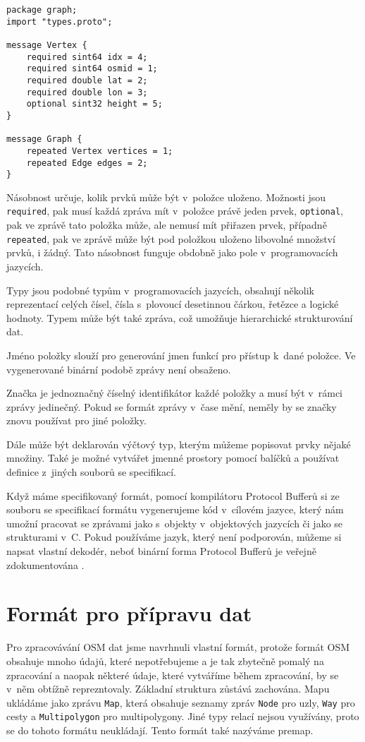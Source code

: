 \begin{verbatim}
package graph;
import "types.proto";

message Vertex {
    required sint64 idx = 4;
    required sint64 osmid = 1;
    required double lat = 2;
    required double lon = 3;
    optional sint32 height = 5;
}

message Graph {
    repeated Vertex vertices = 1;
    repeated Edge edges = 2;
}
\end{verbatim}

{\tuc Násobnost} určuje, kolik prvků může být v~položce uloženo. Možnosti jsou
\verb|required|, pak musí každá zpráva mít v~položce právě jeden prvek,
\verb|optional|, pak ve zprávě tato položka může, ale nemusí mít přiřazen prvek,
případně \verb|repeated|, pak ve zprávě může být pod položkou uloženo libovolné
množství prvků, i žádný. Tato násobnost funguje obdobně jako pole
v~programovacích jazycích. 

\smallskip
{\tuc Typy} jsou podobné typům v~programovacích jazycích, obsahují několik
reprezentací celých čísel, čísla s~plovoucí desetinnou čárkou, řetězce a logické
hodnoty. Typem může být také zpráva, což umožňuje hierarchické strukturování
dat. 

\smallskip
{\tuc Jméno} položky slouží pro generování jmen funkcí pro přístup k~dané
položce. Ve vygenerované binární podobě zprávy není obsaženo. 

\smallskip
{\tuc Značka} je jednoznačný číselný identifikátor každé položky a musí být v~rámci
zprávy jedinečný. Pokud se formát zprávy v~čase mění, neměly by se značky znovu
používat pro jiné položky.

Dále může být deklarován výčtový typ, kterým můžeme popisovat prvky nějaké
množiny. Také je možné vytvářet jmenné prostory pomocí balíčků a používat
definice z~jiných souborů se specifikací.

Když máme specifikovaný formát, pomocí kompilátoru Protocol Bufferů si ze
souboru se specifikací formátu vygenerujeme kód v~cílovém jazyce, který nám
umožní pracovat se zprávami jako s~objekty v~objektových jazycích či jako se
strukturami v~C. Pokud používáme jazyk, který není podporován, můžeme si napsat
vlastní dekodér, neboť binární forma Protocol Bufferů je veřejně
zdokumentována \cite{pbfenc}.

\section{Formát pro přípravu dat}
Pro zpracovávání OSM dat jsme navrhnuli vlastní formát, protože formát OSM
obsahuje mnoho údajů, které nepotřebujeme a je tak zbytečně pomalý na zpracování
a naopak některé údaje, které vytváříme během zpracování, by se v~něm obtížně
reprezntovaly. Základní struktura zůstává zachována. Mapu ukládáme jako zprávu
\verb|Map|, která obsahuje seznamy zpráv \verb|Node| pro uzly, \verb|Way| pro
cesty a \verb|Multipolygon| pro multipolygony. Jiné typy relací nejsou
využívány, proto se do tohoto formátu neukládají. Tento formát také nazýváme
premap\label{label:premap}.

